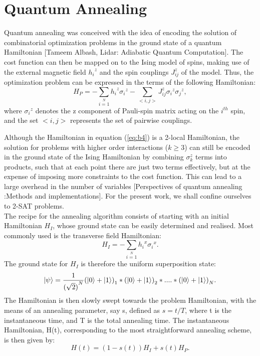 \documentclass[../main.tex]{subfiles}
\begin{document}
\section{Quantum Annealing}
Quantum annealing was conceived with the idea of encoding the solution of combinatorial optimization problems in the ground state of a quantum Hamiltonian [Tameem Albash, Lidar: Adiabatic Quantum Computation]. 
The cost function can then be mapped on to the Ising model of spins, making use of the external magnetic field ${h_i}^z$ and the spin couplings ${J_{ij}^z}$ of the model. Thus, the optimization problem can be expressed in the terms of the following Hamiltonian:
\begin{equation}
H_P=-\sum\limits_{i=1}\limits^{N}{h_i}^z{\sigma_i}^z - \sum\limits_{<i,j>}{J_{ij}^z} {\sigma_i}^z{\sigma_j}^z, \label{eq:b4}
\end{equation}
where ${\sigma_i}^z$ denotes the z component of Pauli-spin matrix acting on the $i^{th}$ spin, and the set $<i,j>$ represents the set of pairwise couplings.

Although the Hamiltonian in equation (\ref{eq:b4}) is a 2-local Hamiltonian, the solution for problems with higher order interactions ($k \geq 3$) can still be encoded in the ground state of the Ising Hamiltonian by combining $\sigma_k^z$ terms into products, such that at each point there are just two terms effectively, but at the expense of imposing more constraints to the cost function. This can lead to a large overhead in the number of variables [Perspectives of quantum annealing :Methods and implementations]. For the present work, we shall confine ourselves to 2-SAT problems. \\

The recipe for the annealing algorithm consists of starting with an initial Hamiltonian $H_I$, whose ground state can be easily determined and realised. Most commonly used is the transverse field Hamiltonian: 
\begin{equation}
H_I=-\sum\limits_{i=1}\limits^{N}{h_i}^x{\sigma_i}^x. \label{eq:b5}
\end{equation}
The ground state for $H_I$ is therefore the uniform superposition state: 
\begin{equation}
\ket{\psi}=\frac{1}{{(\sqrt{2})}^N}{(\ket{0}+\ket{1})}_1*{(\ket{0}+\ket{1})}_2*....*{(\ket{0}+\ket{1})}_N. \label{eq:b6}
\end{equation}
The Hamiltonian is then slowly swept towards the problem Hamiltonian, with the means of an annealing parameter, say s, defined as $s=t/T$, where t is the instantaneous time, and T is the total annealing time. The instantaneous Hamiltonian, H(t), corresponding to the most straightforward annealing scheme, is then given by: 
\begin{equation}
H(t)= (1-s(t))H_I + s(t)H_P. \label{eq:b7}
\end{equation}
\end{document}
